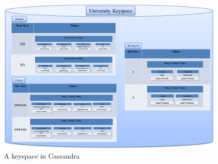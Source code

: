 


\begin{landscape}
\begin{figure}[h]
	\centering
	\includegraphics[width=1.4\textwidth]{./figure/Example/KEYSPACE.png}
	\caption{A keyspace in
	Cassandra}\label{f:keyspace}
\end{figure}
\end{landscape}
